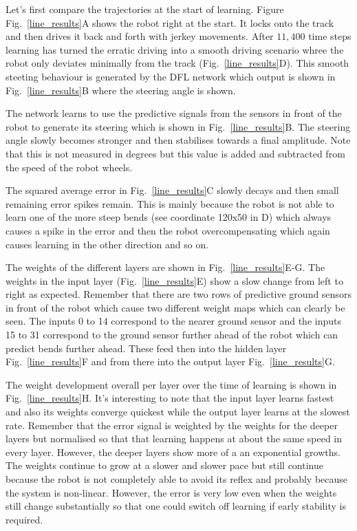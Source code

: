 \documentclass{llncs}
\begin{document}
Let's first compare the trajectories at the start of learning. Figure
Fig.~\ref{line_results}A shows the robot right at the start. It locks
onto the track and then drives it back and forth with jerkey
movements. After $11,400$ time steps learning has turned the erratic
driving into a smooth driving scenario whree the robot only deviates
minimally from the track (Fig.~\ref{line_results}D). This smooth
steeting behaviour is generated by the DFL network which output is
shown in Fig.~\ref{line_results}B where the steering angle is shown.

The network learns to use the predictive signals from the sensors in
front of the robot to generate its steering which is shown in
Fig.~\ref{line_results}B.  The steering angle slowly becomes stronger and
then stabilises towards a final amplitude. Note that this is not
measured in degrees but this value is added and subtracted from the
speed of the robot wheels.

The squared average error in Fig.~\ref{line_results}C slowly decays
and then small remaining error spikes remain. This is mainly because
the robot is not able to learn one of the more steep bends (see
coordinate 120x50 in D) which always causes a spike in the error and
then the robot overcompensating which again causes learning in the
other direction and so on.

The weights of the different layers are shown in
Fig.~\ref{line_results}E-G.  The weights in the input layer
(Fig.~\ref{line_results}E) show a slow change from left to right as
expected. Remember that there are two rows of predictive ground
sensors in front of the robot which cause two different weight maps
which can clearly be seen. The inputs 0 to 14 correspond to the nearer
ground sensor and the inputs 15 to 31 correspond to the ground sensor
further ahead of the robot which can predict bends further
ahead. These feed then into the hidden layer Fig.~\ref{line_results}F
and from there into the output layer Fig.~\ref{line_results}G.

The weight development overall per layer over the time of learning
is shown in Fig.~\ref{line_results}H. It's interesting to note
that the input layer learns fastest and also its weights converge
quickest while the output layer learns at the slowest rate. Remember
that the error signal is weighted by the weights for the deeper
layers but normalised so that that learning happens at about the
same speed in every layer. However, the deeper layers show more
of a an exponential growths. The weights continue to grow at a slower
and slower pace but still continue because the robot is not completely
able to avoid its reflex and probably because the system is non-linear.
However, the error is very low even when the weights still change
substantially so that one could switch off learning if early stability
is required.
\end{document}
